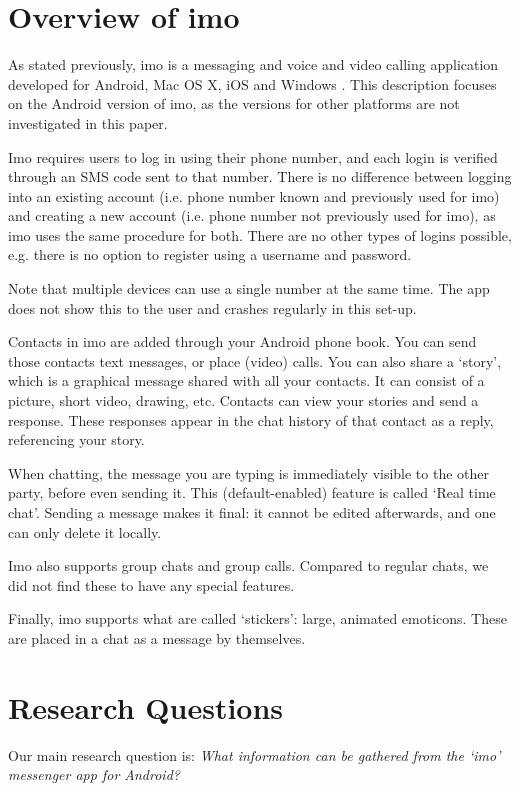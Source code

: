 \documentclass[conference]{IEEEtran}
\begin{document}
\section{Overview of imo}

As stated previously, imo is a messaging and voice and video calling application
developed for Android, Mac OS X, iOS and Windows \cite{imo}. This description
focuses on the Android version of imo, as the versions for other platforms are
not investigated in this paper.

Imo requires users to log in using their phone number, and each login is
verified through an SMS code sent to that number. There is no difference between
logging into an existing account (i.e. phone number known and previously used for
imo) and creating a new account (i.e. phone number not previously used for imo),
as imo uses the same procedure for both. There are no other types of logins
possible, e.g. there is no option to register using a username and password.

Note that multiple devices can use a single number at the same time. The app
does not show this to the user and crashes regularly in this set-up.

Contacts in imo are added through your Android phone book. You can send those
contacts text messages, or place (video) calls. You can also share a `story',
which is a graphical message shared with all your contacts. It can consist of a
picture, short video, drawing, etc. Contacts can view your stories and send a
response. These responses appear in the chat history of that contact as a
reply, referencing your story.

When chatting, the message you are typing is immediately visible to the other
party, before even sending it. This (default-enabled) feature is called `Real
time chat'. Sending a message makes it final: it cannot be edited afterwards,
and one can only delete it locally.

Imo also supports group chats and group calls. Compared to regular chats, we
did not find these to have any special features.

Finally, imo supports what are called `stickers': large, animated emoticons.
These are placed in a chat as a message by themselves.


\section{Research Questions}\label{sec:researchq}

Our main research question is:
{\it What information can be gathered from the `imo' messenger app for Android?}
\end{document}
